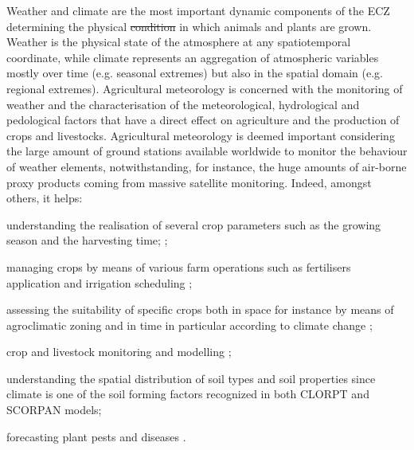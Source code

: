 \documentclass[authoryear,preprint,review,12pt]{elsarticle}
\makeatletter
\providecommand{\DIFadd}[1]{{\protect\color{blue}\uwave{#1}}} %
\providecommand{\DIFdel}[1]{{\protect\color{red}\sout{#1}}} %
\providecommand{\DIFaddbegin}{} %
\providecommand{\DIFaddend}{} %
\providecommand{\DIFdelbegin}{} %
\providecommand{\DIFdelend}{} %
\let\sout@orig\sout %
\renewcommand{\sout}[1]{\ifmmode\text{\sout@orig{\ensuremath{#1}}}\else\sout@orig{#1}\fi} %
\makeatother
\begin{document}

Weather and climate are the most important dynamic components of the ECZ determining the physical \DIFdelbegin \DIFdel{condition }\DIFdelend \DIFaddbegin \DIFadd{conditions }\DIFaddend in which animals and plants are grown.
Weather is the physical state of the atmosphere at any spatiotemporal coordinate, while climate represents an aggregation of atmospheric variables mostly over time (e.g. seasonal extremes) but also in the spatial domain (e.g. regional extremes).
Agricultural meteorology is concerned with the monitoring of weather and the characterisation of the meteorological, hydrological and pedological factors that have a direct effect on agriculture and the production of crops and livestocks.
Agricultural meteorology is deemed important considering the large amount of ground stations available worldwide to monitor the behaviour of weather elements, notwithstanding, for instance, the huge amounts of air-borne proxy products coming from massive satellite monitoring.
Indeed, amongst others, it helps: 
    \begin{enumerate*}
        \item understanding the realisation of several crop parameters such as the growing season and the harvesting time;  \citep{Hoogenboom:agrometeo-swat:2000,Chou2019,Madhukar2021,Richmond2022};
        \item managing crops by means of various farm operations such as fertilisers application and irrigation scheduling \citep{Cammarano2021,Chen2020};
        \item assessing the suitability of specific crops both in space for instance by means of agroclimatic zoning and in time in particular according to climate change \citep{Rokochynskiy2020,Jiang2020};
        \item crop and livestock monitoring and modelling \citep{Vogel2021,Zhang2022};
        \item understanding the spatial distribution of soil types and soil properties since climate is one of the soil forming factors recognized in both CLORPT \citep{jenny:clorpt:1941} and SCORPAN \citep{McBratney:scorpan:2003} models;
        \item forecasting plant pests and diseases \citep{IPM_decisions}.
    \end{enumerate*}
\end{document}
